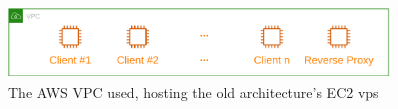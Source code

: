 \begin{figure}[!htbp]
    \centering
    \includegraphics[width=0.90\textwidth]{img/diagrams/pdf/old-arch-overview.drawio.pdf}
    \caption[AWS VPC Overview]{The AWS VPC used, hosting the old architecture's EC2 \gls{vps}}
    \label{fig:old-arch-overview.drawio.pdf}
\end{figure}
    